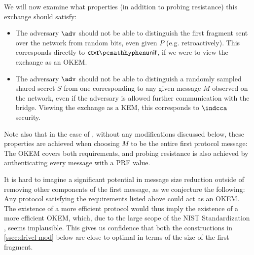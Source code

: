 We will now examine what properties (in addition to probing resistance) this exchange should satisfy:
\begin{itemize}
    \item The adversary $\adv$ should not be able to distinguish the first fragment sent over the network from random bits, even given $P$ (e.g. retroactively). This corresponds directly to $\ctxtunif$, if we were to view the exchange as an OKEM.

    \item The adversary $\adv$ should not be able to distinguish a randomly sampled shared secret $S$ from one corresponding to any given message $M$ observed on the network, even if the adversary is allowed further communication with the bridge. Viewing the exchange as a KEM, this corresponds to $\indcca$ security.
    
\end{itemize}

Note also that in the case of \drivel{}, without any modifications discussed below, these properties are achieved when choosing $M$ to be the entire first protocol message:
The OKEM covers both requirements, and probing resistance is also achieved by authenticating every message with a PRF value.

It is hard to imagine a significant potential in message size reduction outside of removing other components of the first \drivel{} message, as we conjecture the following:
Any protocol satisfying the requirements listed above could act as an OKEM.
The existence of a more efficient protocol would thus imply the existence of a more efficient OKEM, which, due to the large scope of the NIST Standardization \cite{nist-standardization}, seems implausible.
This gives us confidence that both the constructions in \cref{ssec:drivel-mod} below are close to optimal in terms of the size of the first fragment.


